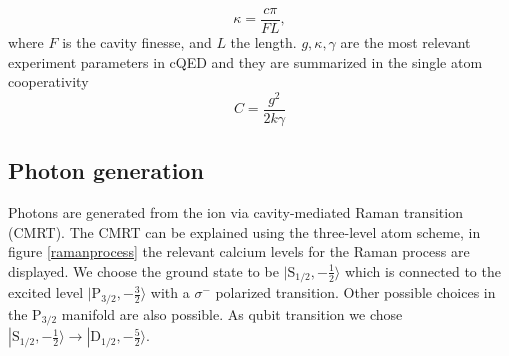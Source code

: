 \begin{equation}
\kappa =\frac{c\pi}{FL},
\end{equation}
where $F$ is the cavity finesse, and $L$ the length. $g,\kappa,\gamma$ are the most relevant experiment parameters in cQED and they are summarized in the single atom cooperativity
\begin{equation}
C = \frac{g^2}{2k\gamma}
\end{equation}

\subsection{Photon generation}
\label{sec:ramanprocess}
Photons are generated from the ion via cavity-mediated Raman transition (CMRT). The CMRT can be explained using the three-level atom scheme, in figure \ref{ramanprocess} the relevant calcium levels for the Raman process are displayed. We choose the ground state to be $|\text{S}_{1/2},-\frac{1}{2}\rangle$ which is connected to the excited level $|\text{P}_{3/2},-\frac{3}{2}\rangle$ with a $\sigma^-$ polarized transition. Other possible choices in the $\text{P}_{3/2}$ manifold are also possible. As qubit transition we chose $|\text{S}_{1/2},-\frac{1}{2}\rangle \to |\text{D}_{1/2},-\frac{5}{2}\rangle$.


